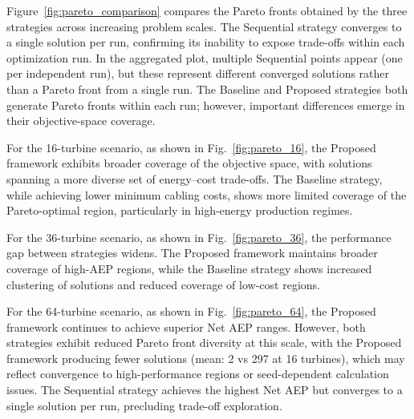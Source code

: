 \documentclass[format=sigconf,anonymous=true,review=true]{acmart}
\begin{document}
Figure~\ref{fig:pareto_comparison} compares the Pareto fronts obtained by the three strategies across increasing problem scales. The Sequential strategy converges to a single solution per run, confirming its inability to expose trade-offs within each optimization run. In the aggregated plot, multiple Sequential points appear (one per independent run), but these represent different converged solutions rather than a Pareto front from a single run. The Baseline and Proposed strategies both generate Pareto fronts within each run; however, important differences emerge in their objective-space coverage.

For the 16-turbine scenario, as shown in Fig.~\ref{fig:pareto_16}, the Proposed framework exhibits broader coverage of the objective space, with solutions spanning a more diverse set of energy--cost trade-offs. The Baseline strategy, while achieving lower minimum cabling costs, shows more limited coverage of the Pareto-optimal region, particularly in high-energy production regimes. 

For the 36-turbine scenario, as shown in Fig.~\ref{fig:pareto_36}, the performance gap between strategies widens. The Proposed framework maintains broader coverage of high-AEP regions, while the Baseline strategy shows increased clustering of solutions and reduced coverage of low-cost regions.

For the 64-turbine scenario, as shown in Fig.~\ref{fig:pareto_64}, the Proposed framework continues to achieve superior Net AEP ranges. However, both strategies exhibit reduced Pareto front diversity at this scale, with the Proposed framework producing fewer solutions (mean: 2 vs 297 at 16 turbines), which may reflect convergence to high-performance regions or seed-dependent calculation issues. The Sequential strategy achieves the highest Net AEP but converges to a single solution per run, precluding trade-off exploration.
\end{document}
